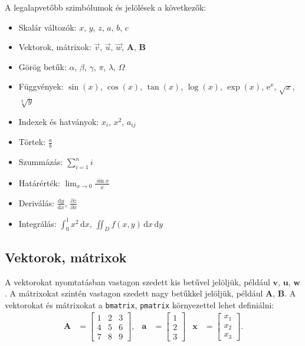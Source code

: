 \documentclass[fleqn,12pt]{article}
\begin{document}
       A legalapvetőbb szimbólumok és jelölések a következők:
        \begin{itemize}
            \item Skalár változók: $x$, $y$, $z$, $a$, $b$, $c$
            \item Vektorok, mátrixok: $\vec{v}$, $\vec{u}$, $\vec{w}$, $\mathbf{A}$, $\mathbf{B}$
            \item Görög betűk: $\alpha$, $\beta$, $\gamma$, $\pi$, $\lambda$, $\Omega$
            \item Függvények: $\sin(x)$, $\cos(x)$, $\tan(x)$, $\log(x)$, $\exp(x)$, $\mathrm{e}^{x}$, $\sqrt{x}$, $\sqrt[3]{y}$
            \item Indexek és hatványok: $x_i$, $x^2$, $a_{ij}$
            \item Törtek: $\frac{a}{b}$
            \item Szummázás: $\sum_{i=1}^{n} i$
            \item Határérték: $\lim_{x \to 0} \frac{\sin x}{x}$
            \item Deriválás: $\frac{\mathrm{d}y}{\mathrm{d}x}$, $\frac{\partial z}{\partial x}$
            \item Integrálás: $\int_{0}^{1} x^2 \,\mathrm{d}x $, $\iint_{D} f(x,y) \,\mathrm{d}x \,\mathrm{d}y$
        \end{itemize}

    \subsection{Vektorok, mátrixok}

        A vektorokat nyomtatásban vastagon szedett kis betűvel jelöljük, például $\mathbf{v}$, $\mathbf{u}$, $\mathbf{w}$. A mátrixokat szintén vastagon szedett nagy betűkkel jelöljük, például $\mathbf{A}$, $\mathbf{B}$. A vektorokat és mátrixokat a \texttt{bmatrix}, \texttt{pmatrix} környezettel lehet definiálni:
        \begin{align}
            \mathbf{A} &=
            \begin{bmatrix}
                1 & 2 & 3 \\
                4 & 5 & 6 \\
                7 & 8 & 9
            \end{bmatrix}, &
            \mathbf{a} &=
            \begin{bmatrix}
                1 \\
                2 \\
                3
            \end{bmatrix} &
            \mathbf{x} &=
            \begin{bmatrix}
                x_1 \\
                x_2 \\
                x_3
            \end{bmatrix}.
        \end{align}
\end{document}
